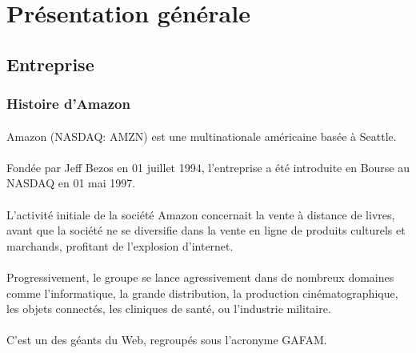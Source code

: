 \section{Présentation générale}

\subsection{Entreprise}
\subsubsection{Histoire d'Amazon}
\paragraph{}
\vspace{-2em}  %
Amazon (NASDAQ: AMZN) est une multinationale américaine basée à Seattle.

\paragraph{}
\vspace{-2em}  %
Fondée par Jeff Bezos en 01 juillet 1994, 
l'entreprise a été introduite en Bourse au NASDAQ en 01 mai 1997.
\paragraph{}
\vspace{-2em}  %
L'activité initiale de la société Amazon concernait la vente à distance de livres, avant que la société ne se diversifie dans la vente en ligne de produits culturels et marchands, profitant de l'explosion d'internet.
\paragraph{}
\vspace{-2em}  %
Progressivement, le groupe se lance agressivement dans de nombreux domaines comme l'informatique, la grande distribution, la production cinématographique, les objets connectés, les cliniques de santé, ou l'industrie militaire.
\paragraph{}
\vspace{-2em}  %
C'est un des géants du Web, regroupés sous l'acronyme GAFAM. \cite{wiki}


